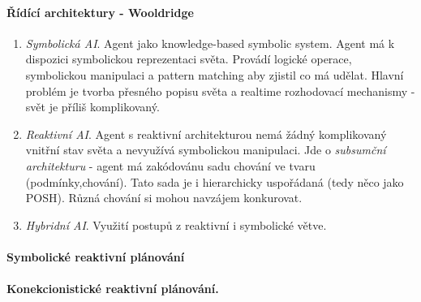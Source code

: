 \documentclass[a4paper]{article}      %
\begin{document}
\paragraph{Řídící architektury - Wooldridge}
\begin{enumerate}
\item \emph{Symbolická AI}. Agent jako knowledge-based symbolic system. Agent má k dispozici symbolickou reprezentaci světa.
Provádí logické operace, symbolickou manipulaci a pattern matching aby zjistil co má udělat. Hlavní problém je tvorba přesného popisu světa a realtime rozhodovací mechanismy - svět je příliš komplikovaný.

\item \emph{Reaktivní AI}. Agent s reaktivní architekturou nemá žádný komplikovaný vnitřní stav světa a nevyužívá symbolickou manipulaci. 
Jde o \emph{subsumční architekturu} - agent má zakódovánu sadu chování ve tvaru (podmínky,chování).
Tato sada je i hierarchicky uspořádaná (tedy něco jako POSH). Různá chování si mohou navzájem konkurovat.  

\item \emph{Hybridní AI}. Využití postupů z reaktivní i symbolické větve.
\end{enumerate}

\paragraph{Symbolické reaktivní plánování}

\paragraph{Konekcionistické reaktivní plánování.}
\end{document}
